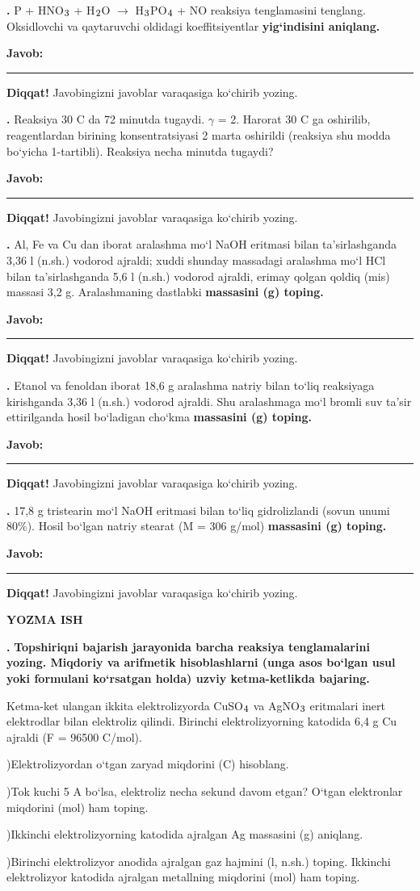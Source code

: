 \documentclass[11pt,a4paper]{article}
\renewcommand{\textsubscript}[1]{\ensuremath{_{\text{\fontsize{8}{8}\selectfont #1}}}}
\newcommand{\qn}[1]{\textbf{\fontsize{11.5}{13}\selectfont #1}}
\newcommand{\qsep}{\par\vspace{1pt}\noindent\rule{0pt}{0.4pt}\par\vspace{5pt}}
\newcommand{\javob}{\par\smallskip\noindent\textbf{Javob:} \rule[-2pt]{7.5cm}{0.4pt}\par\smallskip\noindent\textbf{Diqqat!} Javobingizni javoblar varaqasiga ko`chirib yozing.\par\medskip}
\begin{document}
\par\bigskip
\noindent\qn{36.} P + HNO\textsubscript{3} + H\textsubscript{2}O $\to$ H\textsubscript{3}PO\textsubscript{4} + NO reaksiya tenglamasini tenglang. Oksidlovchi va qaytaruvchi oldidagi koeffitsiyentlar \textbf{yig`indisini aniqlang.}
\javob\qsep
\noindent\qn{37.} Reaksiya 30 \textdegree{}C da 72 minutda tugaydi. $\gamma$ = 2. Harorat 30 \textdegree{}C ga oshirilib, reagentlardan birining konsentratsiyasi 2 marta oshirildi (reaksiya shu modda bo`yicha 1-tartibli). Reaksiya necha minutda tugaydi?
\javob\qsep
\noindent\qn{38.} Al, Fe va Cu dan iborat aralashma mo`l NaOH eritmasi bilan ta'sirlashganda 3,36 l (n.sh.) vodorod ajraldi; xuddi shunday massadagi aralashma mo`l HCl bilan ta'sirlashganda 5,6 l (n.sh.) vodorod ajraldi, erimay qolgan qoldiq (mis) massasi 3,2 g. Aralashmaning dastlabki \textbf{massasini (g) toping.}
\javob\qsep
\noindent\qn{39.} Etanol va fenoldan iborat 18,6 g aralashma natriy bilan to`liq reaksiyaga kirishganda 3,36 l (n.sh.) vodorod ajraldi. Shu aralashmaga mo`l bromli suv ta'sir ettirilganda hosil bo`ladigan cho`kma \textbf{massasini (g) toping.}
\javob\qsep
\noindent\qn{40.} 17,8 g tristearin mo`l NaOH eritmasi bilan to`liq gidrolizlandi (sovun unumi 80\%). Hosil bo`lgan natriy stearat (M = 306 g/mol) \textbf{massasini (g) toping.}
\javob\qsep
\par\bigskip\begin{center}\textbf{\fontsize{13}{15}\selectfont YOZMA ISH}\end{center}
\noindent\qn{41.} \textbf{Topshiriqni bajarish jarayonida barcha reaksiya tenglamalarini yozing. Miqdoriy va arifmetik hisoblashlarni (unga asos bo`lgan usul yoki formulani ko`rsatgan holda) uzviy ketma-ketlikda bajaring.}\par\smallskip
Ketma-ket ulangan ikkita elektrolizyorda CuSO\textsubscript{4} va AgNO\textsubscript{3} eritmalari inert elektrodlar bilan elektroliz qilindi. Birinchi elektrolizyorning katodida 6,4 g Cu ajraldi (F = 96500 C/mol).\par
{})Elektrolizyordan o`tgan zaryad miqdorini (C) hisoblang.\par
{})Tok kuchi 5 A bo`lsa, elektroliz necha sekund davom etgan? O`tgan elektronlar miqdorini (mol) ham toping.\par
{})Ikkinchi elektrolizyorning katodida ajralgan Ag massasini (g) aniqlang.\par
{})Birinchi elektrolizyor anodida ajralgan gaz hajmini (l, n.sh.) toping. Ikkinchi elektrolizyor katodida ajralgan metallning miqdorini (mol) ham toping.\par
\end{document}
